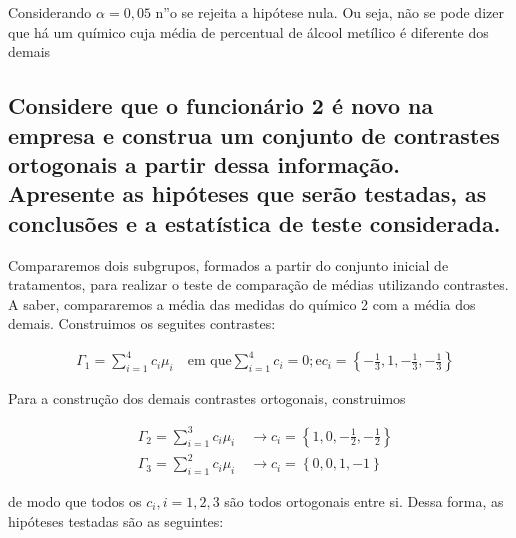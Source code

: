 \documentclass[
]{article}
\begin{document}
Considerando \(\alpha = 0,05\) n''o se rejeita a hipótese nula. Ou seja,
não se pode dizer que há um químico cuja média de percentual de álcool
metílico é diferente dos demais

\hypertarget{considere-que-o-funcionuxe1rio-2-uxe9-novo-na-empresa-e-construa-um-conjunto-de-contrastes-ortogonais-a-partir-dessa-informauxe7uxe3o.-apresente-as-hipuxf3teses-que-seruxe3o-testadas-as-conclusuxf5es-e-a-estatuxedstica-de-teste-considerada.}{%
\subsection{Considere que o funcionário 2 é novo na empresa e construa
um conjunto de contrastes ortogonais a partir dessa informação.
Apresente as hipóteses que serão testadas, as conclusões e a estatística
de teste
considerada.}\label{considere-que-o-funcionuxe1rio-2-uxe9-novo-na-empresa-e-construa-um-conjunto-de-contrastes-ortogonais-a-partir-dessa-informauxe7uxe3o.-apresente-as-hipuxf3teses-que-seruxe3o-testadas-as-conclusuxf5es-e-a-estatuxedstica-de-teste-considerada.}}

Compararemos dois subgrupos, formados a partir do conjunto inicial de
tratamentos, para realizar o teste de comparação de médias utilizando
contrastes. A saber, compararemos a média das medidas do químico 2 com a
média dos demais. Construimos os seguites contrastes:

\begin{align*}
  &\Gamma_1 = \sum\limits_{i = 1}^{4} c_i \mu_i \quad \text{em que} \sum\limits_{i = 1}^{4} c_i = 0; \text{e} c_i = \left\{-\frac{1}{3}, 1, -\frac{1}{3}, -\frac{1}{3}\right\}
\end{align*}

Para a construção dos demais contrastes ortogonais, construimos

\begin{align*}
  &\Gamma_2 = \sum\limits_{i = 1}^{3} c_i \mu_i \quad \longrightarrow
  c_i = \left\{1, 0, -\frac{1}{2}, -\frac{1}{2}\right\} \\
  &\Gamma_3 = \sum\limits_{i = 1}^{2} c_i \mu_i \quad \longrightarrow
  c_i = \left\{0, 0, 1, -1\right\}
\end{align*}

de modo que todos os \(c_i, i = 1, 2, 3\) são todos ortogonais entre si.
Dessa forma, as hipóteses testadas são as seguintes:
\end{document}
